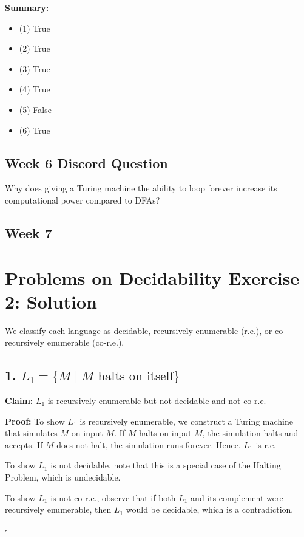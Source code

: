 \documentclass{article}
\theoremstyle{theorem}
\theoremstyle{definition}
\theoremstyle{remark}
\begin{document}
\bigskip

\textbf{Summary:}
\begin{itemize}
    \item (1) True
    \item (2) True
    \item (3) True
    \item (4) True
    \item (5) False
    \item (6) True
\end{itemize}

\subsection*{Week 6 Discord Question}
Why does giving a Turing machine the ability to loop forever increase its computational power compared to DFAs?

\subsection{Week 7}

\section*{Problems on Decidability Exercise 2: Solution}

We classify each language as decidable, recursively enumerable (r.e.), or co-recursively enumerable (co-r.e.).

\subsection*{1. $L_1 = \{ M \mid M \text{ halts on itself} \}$}

\textbf{Claim:} $L_1$ is recursively enumerable but not decidable and not co-r.e.

\textbf{Proof:}
To show $L_1$ is recursively enumerable, we construct a Turing machine that simulates $M$ on input $M$. If $M$ halts on input $M$, the simulation halts and accepts. If $M$ does not halt, the simulation runs forever. Hence, $L_1$ is r.e.

To show $L_1$ is not decidable, note that this is a special case of the Halting Problem, which is undecidable.

To show $L_1$ is not co-r.e., observe that if both $L_1$ and its complement were recursively enumerable, then $L_1$ would be decidable, which is a contradiction.

\hfill $\square$
\end{document}
